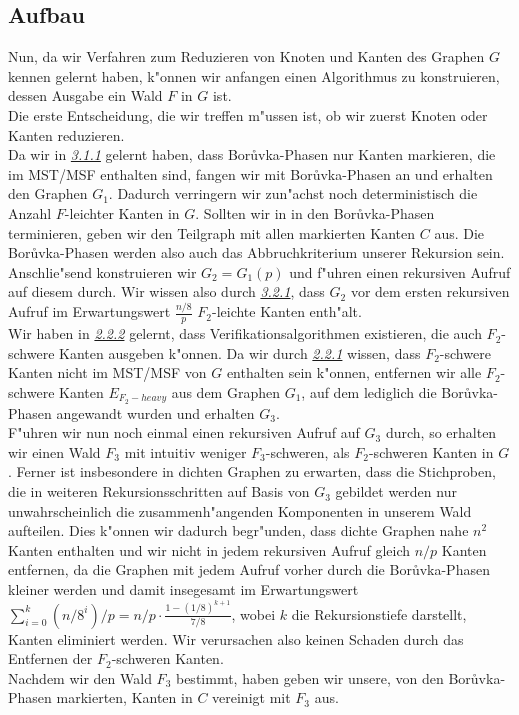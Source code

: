 \subsection{Aufbau}
Nun, da wir Verfahren zum Reduzieren von Knoten und Kanten des Graphen $G$ kennen
    gelernt haben, k"onnen wir anfangen einen Algorithmus zu konstruieren,
    dessen Ausgabe ein Wald $F$ in $G$ ist.\\
Die erste Entscheidung, die wir treffen m"ussen ist, ob wir zuerst Knoten oder Kanten
    reduzieren. \\
Da wir in \hyperref[sec:borIdea]{\textit{3.1.1}} gelernt haben, dass
    Bor\r uvka-Phasen nur Kanten markieren, die im MST/MSF 
    enthalten sind, fangen wir mit Bor\r uvka-Phasen an und erhalten den Graphen 
    $G_1$.
    Dadurch verringern wir
    zun"achst noch deterministisch die Anzahl $F$-leichter Kanten in $G$.
    Sollten wir in in den Bor\r uvka-Phasen terminieren, geben wir den Teilgraph
    mit allen markierten Kanten $C$ aus.
    Die Bor\r uvka-Phasen werden also auch das Abbruchkriterium unserer
    Rekursion sein.\\
Anschlie"send konstruieren wir $G_2 = G_1(p)$ und f"uhren einen rekursiven
    Aufruf auf diesem durch. 
    Wir wissen also durch \hyperref[sec:goodnessRand]{\textit{3.2.1}}, 
    dass $G_2$ vor dem ersten rekursiven Aufruf im Erwartungswert
    $\frac{n/8}{p}$ $F_2$-leichte Kanten enth"alt.\\
Wir haben in \hyperref[sec:verification]{\textit{2.2.2}} gelernt, dass
    Verifikationsalgorithmen existieren, die auch $F_2$-schwere Kanten ausgeben
    k"onnen.
    Da wir durch \hyperref[sec:fProof]{\textit{2.2.1}} wissen, dass $F_2$-schwere Kanten nicht im MST/MSF von $G$
    enthalten sein k"onnen, entfernen wir alle $F_2$-schwere Kanten $E_{F_2-heavy}$
    aus dem Graphen $G_1$,
    auf dem lediglich die Bor\r uvka-Phasen angewandt wurden und erhalten $G_3$.\\
F"uhren wir nun noch einmal einen rekursiven Aufruf auf $G_3$ durch, 
    so erhalten wir 
    einen Wald $F_3$ mit intuitiv weniger $F_3$-schweren, als $F_2$-schweren Kanten in $G$.
    Ferner ist insbesondere in dichten Graphen zu erwarten, dass die Stichproben, 
    die in weiteren Rekursionsschritten auf Basis von $G_3$ gebildet werden 
    nur unwahrscheinlich die zusammenh"angenden Komponenten in unserem Wald
    aufteilen. 
    Dies k"onnen wir dadurch begr"unden, dass dichte Graphen nahe $n^2$ Kanten
    enthalten und wir nicht in jedem rekursiven Aufruf gleich $n/p$ Kanten 
    entfernen, da die Graphen mit jedem Aufruf vorher durch die Bor\r uvka-Phasen
    kleiner werden und damit insegesamt im Erwartungswert 
    $\sum_{i=0}^k (n/8^i)/p = n/p \cdot \frac{1-(1/8)^{k+1}}{7/8}$, wobei $k$
    die Rekursionstiefe darstellt, Kanten eliminiert werden.
    Wir verursachen also keinen Schaden durch das Entfernen der $F_2$-schweren
    Kanten.\\
Nachdem wir den Wald $F_3$ bestimmt, haben geben wir unsere, von den Bor\r uvka-Phasen
    markierten, Kanten in $C$ vereinigt mit $F_3$ aus.\\

